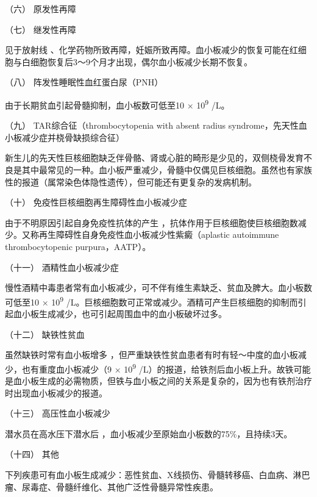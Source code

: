 \hypertarget{text00332.htmlux5cux23CHP12-1-2-1-1-6}{}
（六） 原发性再障

\hypertarget{text00332.htmlux5cux23CHP12-1-2-1-1-7}{}
（七） 继发性再障

见于放射线
、化学药物所致再障，妊娠所致再障。血小板减少的恢复可能在红细胞与白细胞恢复后3～9个月才出现，偶尔血小板减少长期不恢复。

\hypertarget{text00332.htmlux5cux23CHP12-1-2-1-1-8}{}
（八） 阵发性睡眠性血红蛋白尿（PNH）

由于长期贫血引起骨髓抑制，血小板数可低至10 × 10\textsuperscript{9} /L。

\hypertarget{text00332.htmlux5cux23CHP12-1-2-1-1-9}{}
（九） TAR综合征（thrombocytopenia with absent radius
syndrome，先天性血小板减少症并桡骨缺损综合征）

新生儿的先天性巨核细胞缺乏伴骨骼、肾或心脏的畸形是少见的，双侧桡骨发育不良是其中最常见的一种。血小板严重减少，骨髓中仅偶见巨核细胞。虽然也有家族性的报道（属常染色体隐性遗传），但可能还有更复杂的发病机制。

\hypertarget{text00332.htmlux5cux23CHP12-1-2-1-1-10}{}
（十） 免疫性巨核细胞再生障碍性血小板减少症

由于不明原因引起自身免疫性抗体的产生
，抗体作用于巨核细胞使巨核细胞数减少。又称再生障碍性自身免疫性血小板减少性紫癜（aplastic
autoimmune thrombocytopenic purpura，AATP）。

\hypertarget{text00332.htmlux5cux23CHP12-1-2-1-1-11}{}
（十一） 酒精性血小板减少症

慢性酒精中毒患者常有血小板减少，可不伴有维生素缺乏、贫血及脾大。血小板数可低至10
× 10\textsuperscript{9}
/L。巨核细胞数可正常或减少。酒精可产生巨核细胞的抑制而引起血小板生成减少，也可引起周围血中的血小板破坏过多。

\hypertarget{text00332.htmlux5cux23CHP12-1-2-1-1-12}{}
（十二） 缺铁性贫血

虽然缺铁时常有血小板增多
，但严重缺铁性贫血患者有时有轻～中度的血小板减少，也有重度血小板减少（9
× 10\textsuperscript{9}
/L）的报道，给铁剂后血小板上升。故铁可能是血小板生成的必需物质，但铁与血小板之间的关系是复杂的，因为也有铁剂治疗时出现血小板减少的报道。

\hypertarget{text00332.htmlux5cux23CHP12-1-2-1-1-13}{}
（十三） 高压性血小板减少

潜水员在高水压下潜水后 ，血小板减少至原始血小板数的75\%，且持续3天。

\hypertarget{text00332.htmlux5cux23CHP12-1-2-1-1-14}{}
（十四） 其他

下列疾患可有血小板生成减少：恶性贫血、X线损伤、骨髓转移癌、白血病、淋巴瘤、尿毒症、骨髓纤维化、其他广泛性骨髓异常性疾患。

